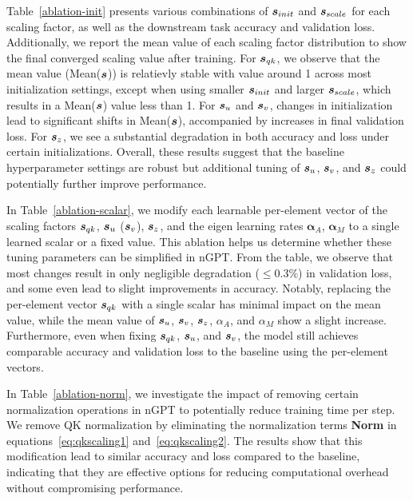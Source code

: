 \documentclass{article} %
\begin{document}
Table~\ref{ablation-init} presents various combinations of ${\bm{s}}_{init}$ and ${\bm{s}}_{scale}$ for each scaling factor, as well as the downstream task accuracy and validation loss. Additionally, we report the mean value of each scaling factor distribution to show the final converged scaling value after training. For ${\bm{s}}_{qk}$, we observe that the mean value (Mean(${\bm{s}}$)) is relatievly stable with value around 1 across most initialization settings, except when using smaller ${\bm{s}}_{init}$ and larger ${\bm{s}}_{scale}$, which results in a Mean(${\bm{s}}$) value less than 1. For ${\bm{s}}_{u}$ and ${\bm{s}}_{v}$, changes in initialization lead to significant shifts in Mean(${\bm{s}}$), accompanied by increases in final validation loss. For ${\bm{s}}_{z}$, we see a substantial degradation in both accuracy and loss under certain initializations. %
Overall, these results suggest that the baseline hyperparameter settings are robust but additional tuning of ${\bm{s}}_u$, ${\bm{s}}_v$, and ${\bm{s}}_z$ could potentially further improve performance. 

In Table~\ref{ablation-scalar}, we modify each learnable per-element vector of the scaling factors ${\bm{s}}_{qk}$, ${\bm{s}}_{u}$ (${\bm{s}}_{v}$), ${\bm{s}}_{z}$, and the eigen learning rates $\bm{\alpha}_{A}$, $\bm{\alpha}_{M}$ to a single learned scalar or a fixed value. This ablation helps us determine whether these tuning parameters can be simplified in nGPT. From the table, we observe that most changes result in only negligible degradation ($\leq0.3\%$) in validation loss, and  some even lead to slight improvements in accuracy. Notably, replacing the per-element vector ${\bm{s}}_{qk}$ with a single scalar has minimal impact on the mean value, while the mean value of ${\bm{s}}_{u}$, ${\bm{s}}_{v}$, ${\bm{s}}_{z}$, $\alpha_{A}$, and $\alpha_{M}$ show a slight increase. Furthermore, even when fixing ${\bm{s}}_{qk}$, ${\bm{s}}_{u}$, and ${\bm{s}}_{v}$, the model still achieves comparable accuracy and validation loss to the baseline using the per-element vectors.

In Table~\ref{ablation-norm}, we investigate the impact of removing certain normalization operations in nGPT to potentially reduce training time per step. We remove QK normalization by eliminating the normalization terms \textbf{Norm} in equations~\ref{eq:qkscaling1} and~\ref{eq:qkscaling2}. The results show that this modification lead to similar accuracy and loss compared to the baseline, indicating that they are effective options for reducing computational overhead without compromising performance.
 \clearpage



\end{document}
